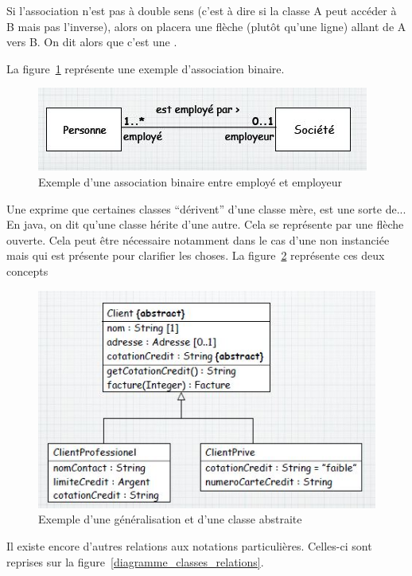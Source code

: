 Si l'association n'est pas à double sens
(c'est à dire si la classe A peut accéder à B mais pas l'inverse),
alors on placera une flèche (plutôt qu'une ligne) allant de A vers B.
On dit alors que c'est une .

La figure~\ref{diagramme_classes_association}
représente une exemple d'association binaire.
\begin{figure}[h]
  \centering
  \includegraphics[scale=1]{diagramme_classes_association.jpg}
  \caption{Exemple d'une association binaire entre employé et employeur}
  \label{diagramme_classes_association}
\end{figure}

Une  exprime que certaines classes
``dérivent'' d'une classe mère,
est une sorte de...
En java, on dit qu'une classe hérite d'une autre.
Cela se représente par une flèche ouverte.
Cela peut être nécessaire notamment dans le cas d'une
 non instanciée mais qui
est présente pour clarifier les choses.
La figure~\ref{diagramme_classes_generalisation} représente ces deux concepts
\begin{figure}[h]
  \centering
  \includegraphics[scale=0.8]{diagramme_classes_generalisation}
  \caption{Exemple d'une généralisation et d'une classe abstraite}
  \label{diagramme_classes_generalisation}
\end{figure}

Il existe encore d'autres relations aux notations particulières.
Celles-ci sont reprises sur la figure~\ref{diagramme_classes_relations}.

